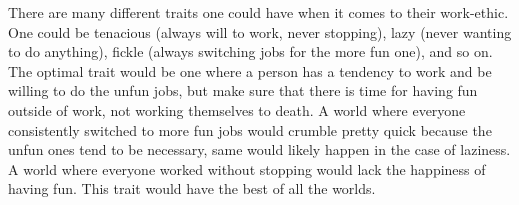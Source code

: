 There are many different traits one could have when it comes to their work-ethic. One could be tenacious (always will to work, never stopping), lazy (never wanting to do anything), fickle (always switching jobs for the more fun one), and so on. The optimal trait would be one where a person has a tendency to work and be willing to do the unfun jobs, but make sure that there is time for having fun outside of work, not working themselves to death. A world where everyone consistently switched to more fun jobs would crumble pretty quick because the unfun ones tend to be necessary, same would likely happen in the case of laziness. A world where everyone worked without stopping would lack the happiness of having fun. This trait would have the best of all the worlds.
